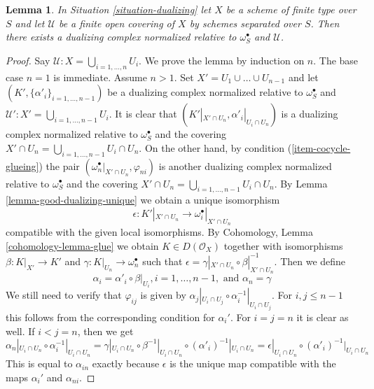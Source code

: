 \documentclass{stacks-project}
\theoremstyle{plain}
\newtheorem{lemma}[subsection]{Lemma}
\theoremstyle{definition}
\theoremstyle{remark}
\numberwithin{equation}{subsection}
\begin{document}
\begin{lemma}
\label{lemma-existence-good-dualizing}
In Situation \ref{situation-dualizing} let $X$ be a scheme of finite type
over $S$ and let $\mathcal{U}$ be a finite open covering
of $X$ by schemes separated over $S$. Then there exists
a dualizing complex normalized relative to $\omega_S^\bullet$ and
$\mathcal{U}$.
\end{lemma}

\begin{proof}
Say $\mathcal{U} : X = \bigcup_{i = 1, \ldots, n} U_i$.
We prove the lemma by induction on $n$. The base case $n = 1$ is immediate.
Assume $n > 1$. Set $X' = U_1 \cup \ldots \cup U_{n - 1}$
and let $(K', \{\alpha'_i\}_{i = 1, \ldots, n - 1})$
be a dualizing complex normalized relative to $\omega_S^\bullet$
and $\mathcal{U}' : X' = \bigcup_{i = 1, \ldots, n - 1} U_i$.
It is clear that $(K'|_{X' \cap U_n}, \alpha'_i|_{U_i \cap U_n})$
is a dualizing complex normalized relative to $\omega_S^\bullet$
and the covering
$X' \cap U_n = \bigcup_{i = 1, \ldots, n - 1} U_i \cap U_n$.
On the other hand, by condition (\ref{item-cocycle-glueing}) the pair
$(\omega_n^\bullet|_{X' \cap U_n}, \varphi_{ni})$
is another dualizing complex normalized relative to $\omega_S^\bullet$
and the covering
$X' \cap U_n = \bigcup_{i = 1, \ldots, n - 1} U_i \cap U_n$.
By Lemma \ref{lemma-good-dualizing-unique} we obtain a unique isomorphism
$$
\epsilon : K'|_{X' \cap U_n} \longrightarrow \omega_i^\bullet|_{X' \cap U_n}
$$
compatible with the given local isomorphisms.
By Cohomology, Lemma \ref{cohomology-lemma-glue}
we obtain $K \in D(\mathcal{O}_X)$ together with
isomorphisms $\beta : K|_{X'} \to K'$ and
$\gamma : K|_{U_n} \to \omega_n^\bullet$ such that
$\epsilon = \gamma|_{X'\cap U_n} \circ \beta|_{X' \cap U_n}^{-1}$.
Then we define
$$
\alpha_i = \alpha'_i \circ \beta|_{U_i}, i = 1, \ldots, n - 1,
\text{ and }
\alpha_n = \gamma
$$
We still need to verify that $\varphi_{ij}$ is given by
$\alpha_j|_{U_i \cap U_j} \circ \alpha_i^{-1}|_{U_i \cap U_j}$.
For $i, j \leq n - 1$ this follows from the corresponding
condition for $\alpha_i'$. For $i = j = n$ it is clear as well.
If $i < j = n$, then we get
$$
\alpha_n|_{U_i \cap U_n} \circ \alpha_i^{-1}|_{U_i \cap U_n} =
\gamma|_{U_i \cap U_n} \circ \beta^{-1}|_{U_i \cap U_n}
\circ (\alpha'_i)^{-1}|_{U_i \cap U_n} =
\epsilon|_{U_i \cap U_n} \circ (\alpha'_i)^{-1}|_{U_i \cap U_n}
$$
This is equal to $\alpha_{in}$ exactly because $\epsilon$
is the unique map compatible with the maps
$\alpha_i'$ and $\alpha_{ni}$.
\end{proof}
\end{document}

